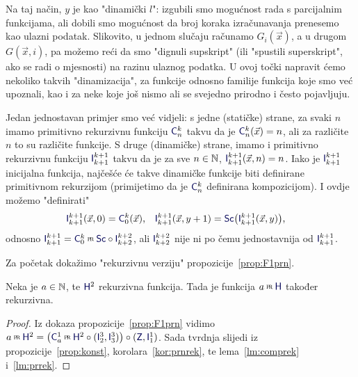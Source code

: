 Na taj način, $y$ je kao "dinamički $l$": izgubili smo mogućnost rada s parcijalnim funkcijama, ali dobili smo mogućnost da broj koraka izračunavanja prenesemo kao ulazni podatak. Slikovito, u jednom slučaju računamo $G_i(\vec x)$, a u drugom $G(\vec x,i)$, pa možemo reći da smo "dignuli supskript" (ili "spustili superskript", ako se radi o mjesnosti) na razinu ulaznog podatka. U ovoj točki napravit ćemo nekoliko takvih "dinamizacija", za funkcije odnosno familije funkcija koje smo već upoznali, kao i za neke koje još nismo ali se svejedno prirodno i često pojavljuju.

\begin{primjer}
Jedan jednostavan primjer smo već vidjeli: s jedne (statičke) strane, za svaki $n$ imamo primitivno rekurzivnu funkciju $\f C_n^k$ takvu da je $\f C_n^k(\vec x)=n$, ali za različite $n$ to su različite funkcije. S druge (dinamičke) strane, imamo i primitivno rekurzivnu funkciju $\f I_{k+1}^{k+1}$ takvu da je za sve $n\in{\mathbb N}$, $\f I_{k+1}^{k+1}(\vec x,n)=n$. Iako je $\f I_{k+1}^{k+1}$ inicijalna funkcija, najčešće će takve dinamičke funkcije biti definirane primitivnom rekurzijom (primijetimo da je $\f C_n^k$ definirana kompozicijom). I ovdje možemo "definirati"
\begin{align}
    \f I_{k+1}^{k+1}(\vec x,0)&=\f C_0^k(\vec x)\text,&
    \f I_{k+1}^{k+1}(\vec x,y+1)&=\f{Sc}\bigl(\f I_{k+1}^{k+1}(\vec x,y)\bigr)\text,
\end{align}
odnosno $\f I_{k+1}^{k+1}=\f C_0^k\pr\f{Sc}\circ\f I_{k+2}^{k+2}$, ali $\f I_{k+2}^{k+2}$ nije ni po čemu jednostavnija od $\f I_{k+1}^{k+1}$.
\end{primjer}

Za početak dokažimo "rekurzivnu verziju" propozicije~\ref{prop:F1prn}.

\begin{korolar}\label{kor:F1rek}
Neka je $a\in{\mathbb N}$, te $\f H^2$ rekurzivna funkcija. Tada je funkcija $a\pr\f H$ također rekurzivna.
\end{korolar}
\begin{proof}
Iz dokaza propozicije~\ref{prop:F1prn}
vidimo $a\pr\f H^2=\bigl(\f C_a^1\pr\f H^2\circ(\f I_2^3,\f I_3^3)\bigr)\circ(\f Z,\f I_1^1)$. Sada tvrdnja slijedi iz propozicije~\ref{prop:konst}, korolara~\ref{kor:prnrek}, te lema~\ref{lm:comprek} i~\ref{lm:prrek}.
\end{proof}


